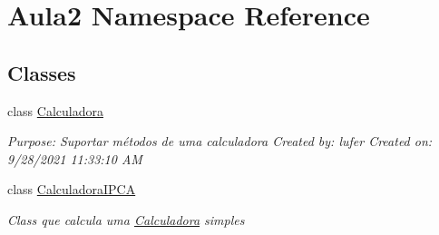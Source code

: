 \hypertarget{namespace_aula2}{}\section{Aula2 Namespace Reference}
\label{namespace_aula2}
\subsection*{Classes}
\begin{DoxyCompactItemize}
\item 
class \mbox{\hyperlink{class_aula2_1_1_calculadora}{Calculadora}}
\begin{DoxyCompactList}\small\item\em Purpose\+: Suportar métodos de uma calculadora Created by\+: lufer Created on\+: 9/28/2021 11\+:33\+:10 AM \end{DoxyCompactList}\item 
class \mbox{\hyperlink{class_aula2_1_1_calculadora_i_p_c_a}{Calculadora\+I\+P\+CA}}
\begin{DoxyCompactList}\small\item\em Class que calcula uma \mbox{\hyperlink{class_aula2_1_1_calculadora}{Calculadora}} simples \end{DoxyCompactList}\end{DoxyCompactItemize}
